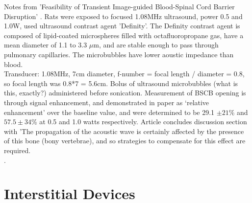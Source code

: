 \documentclass[11pt,titlepage]{article} %
\begin{document}
Notes from 'Feasibility of Transient Image-guided Blood-Spinal Cord Barrier Disruption' \cite{wachsmuth2009feasibility}.
Rats were exposed to focused 1.08MHz ultrasound, power 0.5 and 1.0W, used ultrasound contrast agent 'Definity'. The Definity contrast agent is composed of lipid-coated microspheres filled with octafluoropropane gas, have a mean diameter of 1.1 to 3.3 $\mu$m, and are stable enough to pass through pulmonary capillaries. The microbubbles have lower aoustic impedance than blood. \\
Transducer: 1.08MHz, 7cm diameter, f-number = focal length / diameter = 0.8, so focal length was 0.8*7 = 5.6cm. Bolus of ultrasound microbubbles (what is this, exactly?) administered before sonication. Measurement of BSCB opening is through signal enhancement, and demonstrated in paper as `relative enhancement' over the baseline value, and were determined to be 29.1 $\pm 21\%$ and $57.5 \pm 34\%$ at 0.5 and 1.0 watts respectively. Article concludes discussion section with 'The propagation of the acoustic wave is certainly affected by the presence of this bone (bony vertebrae), and so strategies to compensate for this effect are required.\\


. 


\section{Interstitial Devices}
\end{document}

